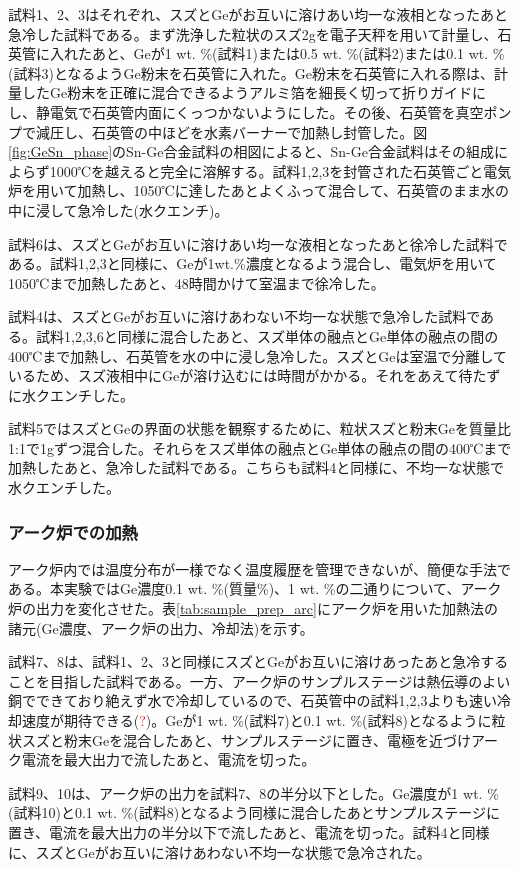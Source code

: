 試料1、2、3はそれぞれ、スズとGeがお互いに溶けあい均一な液相となったあと急冷した試料である。まず洗浄した粒状のスズ2gを電子天秤を用いて計量し、石英管に入れたあと、Geが1 wt. \%(試料1)または0.5 wt. \%(試料2)または0.1 wt. \%(試料3)となるようGe粉末を石英管に入れた。Ge粉末を石英管に入れる際は、計量したGe粉末を正確に混合できるようアルミ箔を細長く切って折りガイドにし、静電気で石英管内面にくっつかないようにした。その後、石英管を真空ポンプで減圧し、石英管の中ほどを水素バーナーで加熱し封管した。図\ref{fig:GeSn_phase}のSn-Ge合金試料の相図によると、Sn-Ge合金試料はその組成によらず1000℃を越えると完全に溶解する。試料1,2,3を封管された石英管ごと電気炉を用いて加熱し、1050℃に達したあとよくふって混合して、石英管のまま水の中に浸して急冷した(水クエンチ)。

試料6は、スズとGeがお互いに溶けあい均一な液相となったあと徐冷した試料である。試料1,2,3と同様に、Geが1wt.\%濃度となるよう混合し、電気炉を用いて1050℃まで加熱したあと、48時間かけて室温まで徐冷した。

試料4は、スズとGeがお互いに溶けあわない不均一な状態で急冷した試料である。試料1,2,3,6と同様に混合したあと、スズ単体の融点とGe単体の融点の間の400℃まで加熱し、石英管を水の中に浸し急冷した。スズとGeは室温で分離しているため、スズ液相中にGeが溶け込むには時間がかかる。それをあえて待たずに水クエンチした。

試料5ではスズとGeの界面の状態を観察するために、粒状スズと粉末Geを質量比1:1で1gずつ混合した。それらをスズ単体の融点とGe単体の融点の間の400℃まで加熱したあと、急冷した試料である。こちらも試料4と同様に、不均一な状態で水クエンチした。

\subsubsection{アーク炉での加熱}
アーク炉内では温度分布が一様でなく温度履歴を管理できないが、簡便な手法である。本実験ではGe濃度0.1 wt. \%(質量\%)、1 wt. \%の二通りについて、アーク炉の出力を変化させた。表\ref{tab:sample_prep_arc}にアーク炉を用いた加熱法の諸元(Ge濃度、アーク炉の出力、冷却法)を示す。

試料7、8は、試料1、2、3と同様にスズとGeがお互いに溶けあったあと急冷することを目指した試料である。一方、アーク炉のサンプルステージは熱伝導のよい銅でできており絶えず水で冷却しているので、石英管中の試料1,2,3よりも速い冷却速度が期待できる(\textcolor{red}{?})。Geが1 wt. \%(試料7)と0.1 wt. \%(試料8)となるように粒状スズと粉末Geを混合したあと、サンプルステージに置き、電極を近づけアーク電流を最大出力で流したあと、電流を切った。

試料9、10は、アーク炉の出力を試料7、8の半分以下とした。Ge濃度が1 wt. \%(試料10)と0.1 wt. \%(試料8)となるよう同様に混合したあとサンプルステージに置き、電流を最大出力の半分以下で流したあと、電流を切った。試料4と同様に、スズとGeがお互いに溶けあわない不均一な状態で急冷された。

